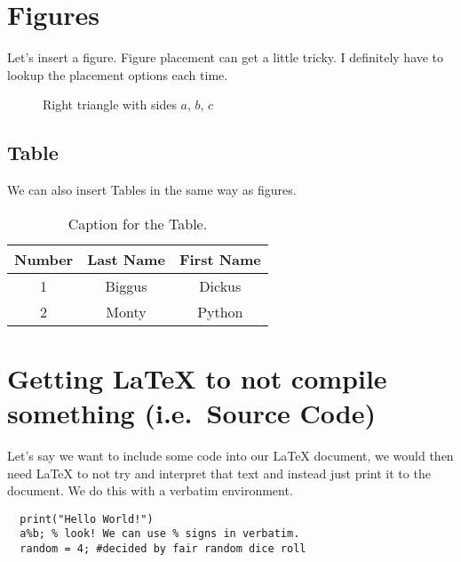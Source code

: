 \documentclass[12pt]{article}
\begin{document}
\section{Figures}

Let's insert a figure. Figure placement can get a little tricky.
I definitely have to lookup the placement options each time.

\begin{figure}[H] %
    \centering %
    \caption{Right triangle with sides $a$, $b$, $c$}
    \label{fig:right-triangle}
\end{figure}

\subsection{Table}
We can also insert Tables in the same way as figures.

\begin{table}[H]
  \caption{Caption for the Table.}
  \begin{tabular}{c|cc}
    Number &  Last Name & First Name \\ %
    \hline %
    1 & Biggus & Dickus \\
    2 & Monty & Python
  \end{tabular}
\end{table}

\section{Getting \LaTeX{} to not compile something (i.e.\ Source Code)}
Let's say we want to include some code into our \LaTeX{} document,
we would then need \LaTeX{} to not try and interpret that text and
instead just print it to the document. We do this with a verbatim
environment.

\begin{verbatim}
  print("Hello World!")
  a%b; % look! We can use % signs in verbatim.
  random = 4; #decided by fair random dice roll
\end{verbatim}
\end{document}

